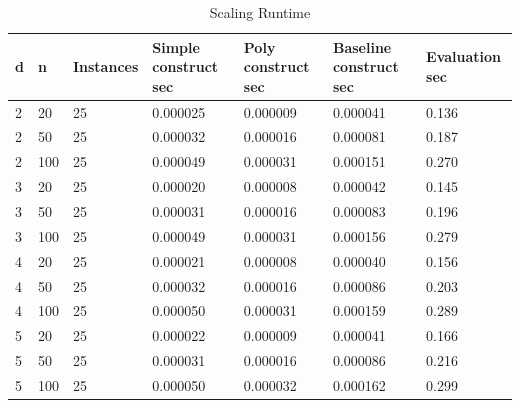\begin{table}[t]
\centering
\small
\caption{Scaling Runtime}
\begin{tabular}{lllllll}
\toprule
d & n & Instances & Simple construct sec & Poly construct sec & Baseline construct sec & Evaluation sec \\
\midrule
2 & 20 & 25 & 0.000025 & 0.000009 & 0.000041 & 0.136 \\
2 & 50 & 25 & 0.000032 & 0.000016 & 0.000081 & 0.187 \\
2 & 100 & 25 & 0.000049 & 0.000031 & 0.000151 & 0.270 \\
3 & 20 & 25 & 0.000020 & 0.000008 & 0.000042 & 0.145 \\
3 & 50 & 25 & 0.000031 & 0.000016 & 0.000083 & 0.196 \\
3 & 100 & 25 & 0.000049 & 0.000031 & 0.000156 & 0.279 \\
4 & 20 & 25 & 0.000021 & 0.000008 & 0.000040 & 0.156 \\
4 & 50 & 25 & 0.000032 & 0.000016 & 0.000086 & 0.203 \\
4 & 100 & 25 & 0.000050 & 0.000031 & 0.000159 & 0.289 \\
5 & 20 & 25 & 0.000022 & 0.000009 & 0.000041 & 0.166 \\
5 & 50 & 25 & 0.000031 & 0.000016 & 0.000086 & 0.216 \\
5 & 100 & 25 & 0.000050 & 0.000032 & 0.000162 & 0.299 \\
\bottomrule
\end{tabular}
\end{table}
